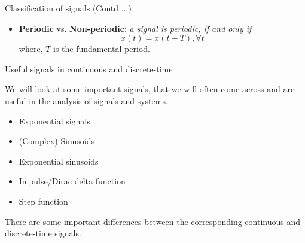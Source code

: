 \documentclass[aspectratio=169]{beamer}
\let\olditem\item
\renewcommand{\item}{\setlength{\itemsep}{\fill}\olditem}
\begin{document}
\begin{frame}[t]{Classification of signals (Contd ...)}
\begin{itemize}
\item \textbf{Periodic} vs. \textbf{Non-periodic}: \textit{a signal is periodic, if and only if}
\[x\left(t\right) = x\left(t + T\right), \forall t\]
where, $T$ is the fundamental period.
\end{itemize}
\end{frame}



\begin{frame}[t]
\end{frame}



\begin{frame}[t]
\end{frame}














\begin{frame}{Useful signals in continuous and discrete-time}

We will look at some important signals, that we will often come across and are useful in the analysis of signals and systems.
\begin{itemize}
\item Exponential signals
\item (Complex) Sinusoids
\item Exponential sinusoids
\item Impulse/Dirac delta function
\item Step function
\end{itemize}

There are some important differences between the corresponding continuous and discrete-time signals.

\end{frame}
\end{document}
